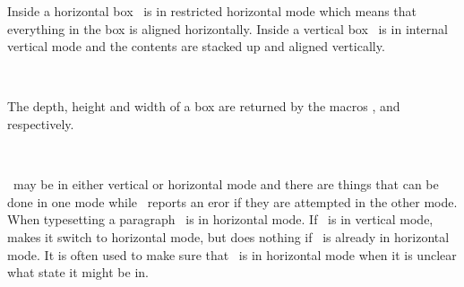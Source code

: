     Inside a horizontal box \tx\ is in restricted horizontal 
mode
which means that everything in the box is aligned horizontally.
Inside a vertical box \tx\ is in internal vertical 
mode and the contents are stacked up 
and aligned vertically.

\begin{syntax}
\cmd{\dp} \cmd{\ht} \cmd{\wd} \\
\end{syntax}
The depth, height and width of a box are returned by the macros
\cmd{\dp}, \cmd{\ht} and \cmd{\wd} respectively.

\begin{syntax}
\cmd{\leavevmode} \\
\end{syntax}
\tx\ may be in either vertical or horizontal mode and there are
things that can be done in one mode while \tx\ reports an eror if they
are attempted in the other mode. When typesetting a paragraph \tx\
is in horizontal mode. If \tx\ is in vertical mode, \cmd{\leavevmode} 
makes it switch to horizontal mode, but does nothing if \tx\ is already
in horizontal mode. It is often used to make sure that \tx\ is in horizontal
mode when it is unclear what state it might be in.

